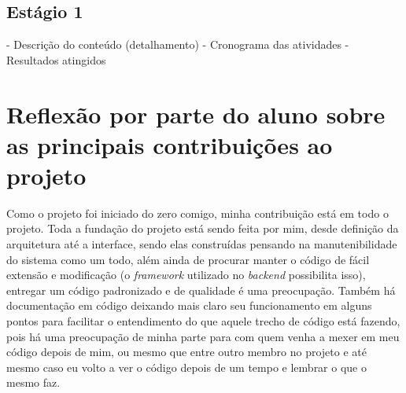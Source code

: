 \documentclass{ufscar}
\begin{document}
\subsection{Estágio 1}
- Descrição do conteúdo (detalhamento)
- Cronograma das atividades
- Resultados atingidos


\section{Reflexão por parte do aluno sobre as principais contribuições ao projeto}
Como o projeto foi iniciado do zero comigo, minha contribuição está em todo o projeto. Toda a fundação do projeto está sendo feita por mim, desde definição da arquitetura até a interface, sendo elas construídas pensando na manutenibilidade do sistema como um todo, além ainda de procurar manter o código de fácil extensão e modificação (o \textit{framework} utilizado no \textit{backend} possibilita isso), entregar um código padronizado e de qualidade é uma preocupação. Também há documentação em código deixando mais claro seu funcionamento em alguns pontos para facilitar o entendimento do que aquele trecho de código está fazendo, pois há uma preocupação de minha parte para com quem venha a mexer em meu código depois de mim, ou mesmo que entre outro membro no projeto e até mesmo caso eu volto a ver o código depois de um tempo e lembrar o que o mesmo faz.
\end{document}

